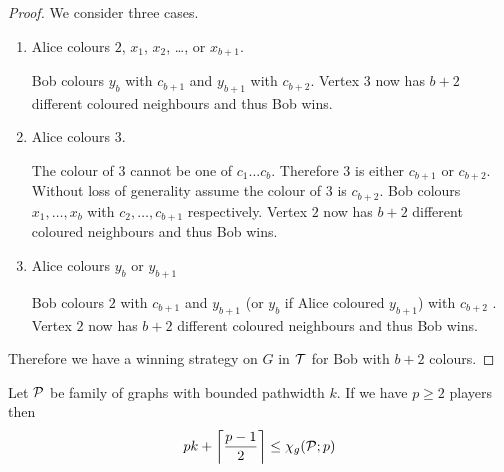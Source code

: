 \begin{proof}
    We consider three cases.
    
    \begin{enumerate}
        \item Alice colours $2$, $x_1$, $x_2$, \ldots, or $x_{b+1}$.
        
        Bob colours $y_{b}$ with $c_{b+1}$ and $y_{b+1}$ with $c_{b+2}$. 
        Vertex $3$ now has $b+2$ different coloured neighbours and thus Bob wins.     
                    
        \item Alice colours $3$.
               
        The colour of $3$ cannot be one of $c_1 \ldots c_{b}$. Therefore $3$ is either $c_{b+1}$ or $c_{b+2}$. 
        Without loss of generality assume the colour of $3$ is $c_{b+2}$.
        Bob colours $x_1, \dots ,x_{b}$ with $c_2,\dots,c_{b+1}$ respectively.
        Vertex $2$ now has $b+2$ different coloured neighbours and thus Bob wins.  
                       
        \item Alice colours $y_{b}$ or $y_{b+1}$
        
        Bob colours $2$ with $c_{b+1}$ and $y_{b+1}$ (or $y_{b}$ if Alice coloured $y_{b+1}$) with $c_{b+2}$ .
        Vertex $2$ now has $b+2$ different coloured neighbours and thus Bob wins. 
    \end{enumerate}

    Therefore we have a winning strategy on $G$ in $\mathcal{T}$ for Bob with $b+2$ colours. 
\end{proof}

\begin{theorem}
    Let $\mathcal{P}$ be family of graphs with bounded pathwidth $k$. If we have $p\geq2$ players then \[pk+\left\lceil \frac{p-1}{2}\right\rceil\leq\chi_g(\mathcal{P};p)\]
\end{theorem}

